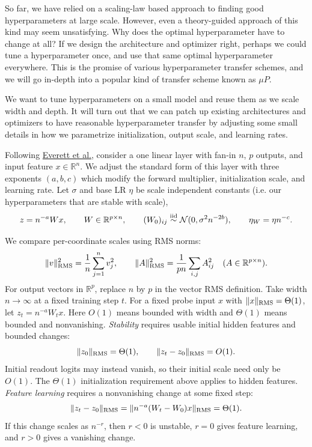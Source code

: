 \clearpage
{}

So far, we have relied on a scaling-law based approach to finding good hyperparameters at large scale. However, even a theory-guided approach of this kind may seem unsatisfying. Why does the optimal hyperparameter have to change at all? If we design the architecture and optimizer right, perhaps we could tune a hyperparameter once, and use that same optimal hyperparameter everywhere. This is the promise of various hyperparameter transfer schemes, and we will go in-depth into a popular kind of transfer scheme known as $\mu P$.

We want to tune hyperparameters on a small model and reuse them as we scale width
and depth. It will turn out that we can patch up existing architectures and optimizers to have reasonable hyperparameter transfer by adjusting some small details in how we parametrize initialization, output scale, and learning rates.

Following
\href{https://arxiv.org/abs/2407.05872}{Everett et al.}, consider a one linear
layer with fan-in $n$, $p$ outputs, and input feature $x\in\mathbb R^n$.
We adjust the standard form of this layer with three exponents $(a,b,c)$ which modify the forward multiplier, initialization scale,
and learning rate. Let $\sigma$ and base LR $\eta$ be scale independent constants (i.e. our hyperparameters that are stable with scale),
\[
 z=n^{-a}Wx,\qquad W\in\mathbb R^{p\times n},\qquad
 (W_0)_{ij}\overset{\rm iid}{\sim}\mathcal N(0,\sigma^2n^{-2b}),\qquad
 \eta_W=\eta n^{-c}.
\]

We compare per-coordinate scales using RMS norms:
\[
 \|v\|_{\rm RMS}^2=\frac1n\sum_{j=1}^nv_j^2,\qquad
 \|A\|_{\rm RMS}^2=\frac1{pn}\sum_{i,j}A_{ij}^2
 \quad(A\in\mathbb R^{p\times n}).
\]
For output vectors in $\mathbb R^p$, replace $n$ by $p$ in the vector RMS definition.
Take width $n\to\infty$ at a fixed training step $t$. For a fixed probe input
$x$ with $\|x\|_{\rm RMS}=\Theta(1)$, let $z_t=n^{-a}W_tx$.
Here $O(1)$ means bounded with width and $\Theta(1)$ means bounded and nonvanishing.
\emph{Stability} requires usable initial hidden features and bounded changes:
\[
 \|z_0\|_{\rm RMS}=\Theta(1),\qquad
 \|z_t-z_0\|_{\rm RMS}=O(1).
\]
Initial readout logits may instead vanish, so their initial scale need only be $O(1)$. The $\Theta(1)$ initialization requirement above applies to hidden features.
\emph{Feature learning} requires a nonvanishing change at some fixed step:
\[
 \|z_t-z_0\|_{\rm RMS}
 =\|n^{-a}(W_t-W_0)x\|_{\rm RMS}=\Theta(1).
\]
If this change scales as $n^{-r}$, then $r<0$ is unstable, $r=0$ gives feature
learning, and $r>0$ gives a vanishing change.


